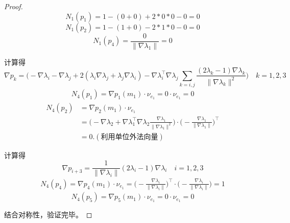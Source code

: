 \documentclass[12pt,a4paper]{article}
\begin{document}
\begin{enumerate}
\begin{proof}
			$$N_1(p_1) = 1-(0+0)+2*0*0-0 = 0$$
			$$N_1(p_2) = 1- (1+0) - 2*1*0 - 0 = 0$$
			$$N_1(p_4) = \frac{0}{\|\nabla \lambda_1\|} = 0$$
			
			计算得
			$$
			\nabla p_{k}=\Big(-\nabla\lambda_i-\nabla\lambda_j+2(\lambda_i\nabla\lambda_j+\lambda_j\nabla\lambda_i)-\nabla\lambda_i^\top\nabla\lambda_j\sum_{k=i,j}\frac{(2\lambda_k-1)\nabla\lambda_k}{\|\nabla\lambda_k\|^2}\Big) \quad k = 1,2,3
			$$
			\begin{equation*}
				\begin{aligned}
					N_4(p_1) = \nabla p_1 (m_1) \cdot \nu_{e_1} = 0 \cdot \nu_{e_1} = 0
				\end{aligned}
			\end{equation*}
			\begin{equation*}
				\begin{aligned}
					N_4(p_2) &= \nabla p_2 (m_1) \cdot \nu_{e_1} \\
					&=\Big( -\nabla\lambda_{2}+\nabla\lambda_{1}^{\top}\nabla\lambda_{2}\frac{\nabla\lambda_{1}}{\|\nabla\lambda_{1}\|^{2} } \Big) \cdot  \Big(-\frac{\nabla \lambda_1}{\|\nabla \lambda_1\|}\Big)^\top\\
					&= 0.  (\text{利用单位外法向量})
				\end{aligned}
			\end{equation*}
			
			计算得
			$$\nabla p_{i+3}=\frac{1}{\|\nabla\lambda_i\|}(2\lambda_i-1)\nabla\lambda_i \quad i = 1,2,3$$
			\begin{equation*}
				\begin{aligned}
					N_4(p_4) = \nabla p_4(m_1) \cdot \nu_{e_1} = \Big(-\frac{\nabla \lambda_i}{\|\nabla \lambda_i\|}\Big)^\top\cdot \Big(-\frac{\nabla \lambda_i}{\|\nabla \lambda_i\|}\Big) = 1
				\end{aligned}
			\end{equation*}
			$$N_4(p_5) = \nabla p_5 (m_1) \cdot \nu_{e_1} = 0 \cdot \nu_{e_1} = 0$$
			
			结合对称性，验证完毕。
		\end{proof}
	\end{enumerate}
	
	
\end{document}
